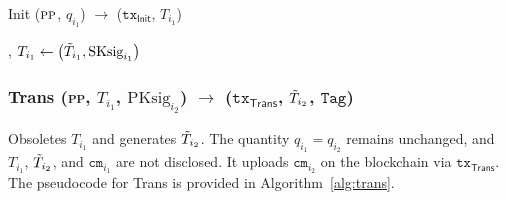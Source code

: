 \begin{algorithm}[h]
\caption{\textsf{Init} ($\textsc{pp}$, $q_{i_1}$) $\rightarrow$ ($\texttt{tx}_{\textsf{Init}}$, $T_{i_1}$) }\label{alg:Init}
\begin{algorithmic}[1]
, {$T_{i_1} \gets \big(\Tilde{T}_{i_1}, \text{SKsig}_{i_1}\big)$}

\end{algorithmic}
\end{algorithm}

\newpage

\subsubsection{\textsf{Trans} (\textsc{pp}, $T_{i_1}$,  $\text{PKsig}_{i_2}$) $\rightarrow$ ($\texttt{tx}_{\textsf{Trans}}$, $\Tilde{T}_{i_2}$, $\texttt{Tag}$)}

Obsoletes  $T_{i_1}$ and generates $\Tilde{T}_{i_2}$. The quantity $q_{i_1}=q_{i_2}$ remains unchanged, and $T_{i_1}$, $\Tilde{T}_{i_2}$, and $\texttt{cm}_{i_1}$ are not disclosed. It uploads $\texttt{cm}_{i_2}$ on the blockchain via $\texttt{tx}_\mathsf{Trans}$. The pseudocode for \textsf{Trans} is provided in Algorithm~\ref{alg:trans}.

